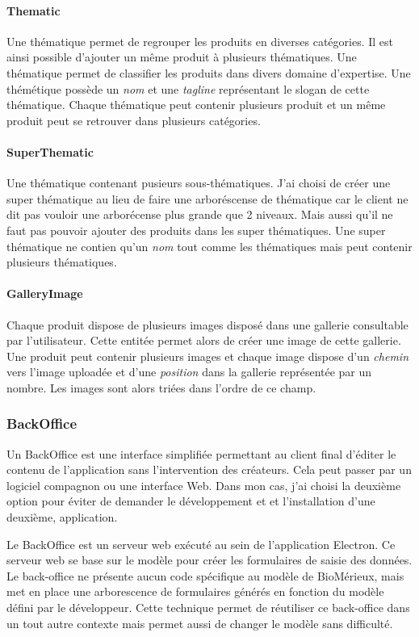\paragraph{Thematic} Une thématique permet de regrouper les produits en diverses catégories.
Il est ainsi possible d'ajouter un même produit à plusieurs thématiques.
Une thématique permet de classifier les produits dans divers domaine d'expertise.
Une thémétique possède un \emph{nom} et une \emph{tagline} représentant le slogan de cette thématique.
Chaque thématique peut contenir plusieurs produit et un même produit peut se retrouver dans plusieurs catégories.

\paragraph{SuperThematic} Une thématique contenant pusieurs sous-thématiques.
J'ai choisi de créer une super thématique au lieu de faire une arboréscense de thématique car le client ne dit pas vouloir une arborécense plus grande que 2 niveaux.
Mais aussi qu'il ne faut pas pouvoir ajouter des produits dans les super thématiques.
Une super thématique ne contien qu'un \emph{nom} tout comme les thématiques mais peut contenir plusieurs thématiques.

\paragraph{GalleryImage} Chaque produit dispose de plusieurs images disposé dans une gallerie consultable par l'utilisateur.
Cette entitée permet alors de créer une image de cette gallerie.
Une produit peut contenir plusieurs images et chaque image dispose d'un \emph{chemin} vers l'image uploadée et d'une \emph{position} dans la gallerie représentée par un nombre.
Les images sont alors triées dans l'ordre de ce champ.

\subsubsection{BackOffice}

Un BackOffice est une interface simplifiée permettant au client final d'éditer le contenu de l'application sans l'intervention des créateurs.
Cela peut passer par un logiciel compagnon ou une interface Web.
Dans mon cas, j'ai choisi la deuxième option pour éviter de demander le développement et et l'installation d'une deuxième, application.

Le BackOffice est un serveur web exécuté au sein de l'application Electron.
Ce serveur web se base sur le modèle pour créer les formulaires de saisie des données.
Le back-office ne présente aucun code spécifique au modèle de BioMérieux, mais met en place une arborescence de formulaires générés en fonction du modèle défini par le développeur.
Cette technique permet de réutiliser ce back-office dans un tout autre contexte mais permet aussi de changer le modèle sans difficulté.

